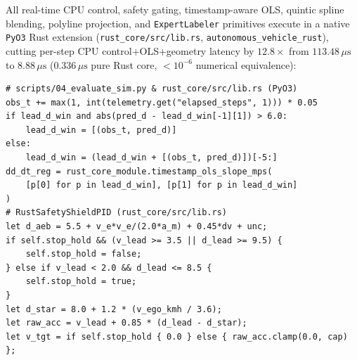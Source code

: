 \documentclass[10pt,twocolumn,letterpaper]{article}
\begin{document}
All real-time CPU control, safety gating, timestamp-aware OLS, quintic spline blending, polyline projection, and \texttt{ExpertLabeler} primitives execute in a native \texttt{PyO3} Rust extension (\texttt{rust\_core/src/lib.rs}, \texttt{autonomous\_vehicle\_rust}), cutting per-step CPU control+OLS+geometry latency by $12.8\times$ from $113.48\,\mu\text{s}$ to $8.88\,\mu\text{s}$ ($0.336\,\mu\text{s}$ pure Rust core, $<10^{-6}$ numerical equivalence):
\begin{scriptsize}
\begin{verbatim}
# scripts/04_evaluate_sim.py & rust_core/src/lib.rs (PyO3)
obs_t += max(1, int(telemetry.get("elapsed_steps", 1))) * 0.05
if lead_d_win and abs(pred_d - lead_d_win[-1][1]) > 6.0:
    lead_d_win = [(obs_t, pred_d)]
else:
    lead_d_win = (lead_d_win + [(obs_t, pred_d)])[-5:]
dd_dt_reg = rust_core_module.timestamp_ols_slope_mps(
    [p[0] for p in lead_d_win], [p[1] for p in lead_d_win]
)
# RustSafetyShieldPID (rust_core/src/lib.rs)
let d_aeb = 5.5 + v_e*v_e/(2.0*a_m) + 0.45*dv + unc;
if self.stop_hold && (v_lead >= 3.5 || d_lead >= 9.5) {
    self.stop_hold = false;
} else if v_lead < 2.0 && d_lead <= 8.5 {
    self.stop_hold = true;
}
let d_star = 8.0 + 1.2 * (v_ego_kmh / 3.6);
let raw_acc = v_lead + 0.85 * (d_lead - d_star);
let v_tgt = if self.stop_hold { 0.0 } else { raw_acc.clamp(0.0, cap) };
\end{verbatim}
\end{scriptsize}
\end{document}
